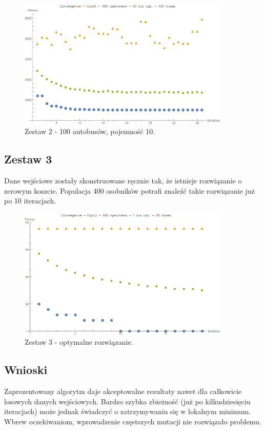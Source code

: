 \documentclass[polish,12pt]{aghthesis}
\begin{document}
\begin{figure}[!htbp]
	\centering
	\includegraphics[width=0.9\textwidth]{convInput4Spec400Bc10Bus100}
	\caption{Zestaw 2 - 100 autobusów, pojemność 10.}
\end{figure}

\subsection{Zestaw 3}

Dane wejściowe zostały skonstruowane ręcznie tak, że istnieje rozwiązanie o zerowym koszcie. Populacja 400 osobników potrafi znaleźć takie rozwiązanie już po 10 iteracjach.

\begin{figure}[!htbp]
	\centering
	\includegraphics[width=0.9\textwidth]{convInput2Spec400Bc1Bus30}
	\caption{Zestaw 3 - optymalne rozwiązanie.}
\end{figure}

\subsection{Wnioski}
Zaprezentowany algorytm daje akceptowalne rezultaty nawet dla całkowicie losowych danych wejściowych. Bardzo szybka zbieżność (już po kilkudziesięciu iteracjach) może jednak świadczyć o zatrzymywaniu się w lokalnym minimum. Wbrew oczekiwaniom, wprowadzenie częstszych mutacji nie rozwiązało problemu.

\newpage



\nocite{bib-transit-oriented}


\newpage

\listoffigures
\newpage
\end{document}
